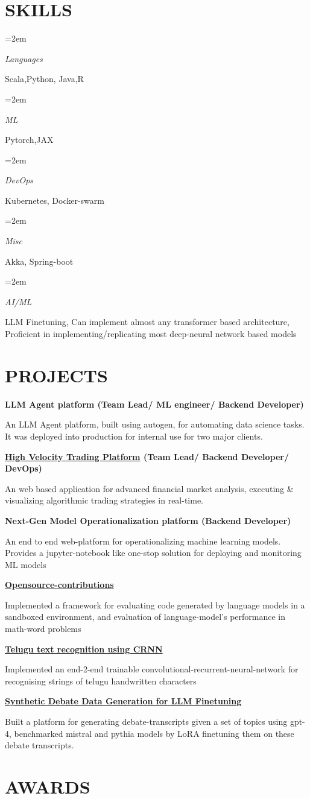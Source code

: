\documentclass[fontsize=11pt]{article}
\newlength{\spacebox}
\newcommand{\sepspace}{\vspace*{1em}}   %
\newcommand{\NewPart}[1]{\section*{\uppercase{#1}}}
\newcommand{\PersonalEntry}[2]{
    \noindent\hangindent=2em\hangafter=0 %
    \parbox{\spacebox}{                  %
    \textit{#1}}                      %
    \hspace{1.5em} #2 \par}              %
\newcommand{\SkillsEntry}[2]{                %
    \noindent\hangindent=2em\hangafter=0 %
    \parbox{\spacebox}{                  %
    \textit{#1}}                    %
    \hspace{1.5em} #2 \par}              %
\newcommand{\EducationEntry}[4]{
    \noindent \textbf{#1} \hfill      %
    \colorbox{Black}{
      \parbox{8.5em}{
      \hfill\color{White}#2}} \par  %
    \noindent \textit{#3} \par        %
    \noindent\hangindent=2em\hangafter=0 \small #4 %
    \normalsize \par}
\newcommand{\ProjectEntry}[4]{         %
    \noindent \textbf{#1} \noindent \textit{#3} \hfill {#2} \par
    \noindent \small #4 %
    \normalsize \par}
\begin{document}
\NewPart{Skills}{}
\SkillsEntry{Languages}{Scala,Python, Java,R}
\SkillsEntry{ML}{Pytorch,JAX}
\SkillsEntry{DevOps}{Kubernetes, Docker-swarm}
\SkillsEntry{Misc}{Akka, Spring-boot}
\SkillsEntry{AI/ML}{LLM Finetuning, Can implement almost any transformer based architecture, Proficient in implementing/replicating most deep-neural network based models}

\NewPart{Projects}{}

\ProjectEntry{LLM Agent platform (Team Lead/ ML engineer/ Backend Developer)}{}
{}
{An LLM Agent platform, built using autogen, for automating data science tasks. It was deployed into production for internal use for two major clients.}
\sepspace
\ProjectEntry{\href{Tplusone.Org}{High Velocity Trading Platform} (Team Lead/ Backend Developer/ DevOps)}{}
{}
{An web based application for advanced financial market analysis, executing \& visualizing algorithmic trading strategies in real-time.}
\sepspace
\pagebreak
\ProjectEntry{Next-Gen Model Operationalization platform (Backend Developer)}{}
{}
{An end to end web-platform for operationalizing machine learning models. Provides a jupyter-notebook like one-stop solution for deploying and monitoring ML models}
\sepspace
\ProjectEntry{\href{https://github.com/rokosbasilisk/code-eval-harness}{Opensource-contributions}}{}
{}
{Implemented a framework for evaluating code generated by language models in a sandboxed environment, and evaluation of language-model's performance in math-word problems}
\sepspace
\ProjectEntry{\href{https://www.ijeat.org/wp-content/uploads/papers/v8i5/E7422068519.pdf}{Telugu text recognition using CRNN}}{}
{}
{Implemented an end-2-end trainable convolutional-recurrent-neural-network for recognising strings of telugu handwritten characters}
\sepspace
\ProjectEntry{\href{https://github.com/rokosbasilisk/synthetic_debates/}{Synthetic Debate Data Generation for LLM Finetuning}}{}
{}
{Built a platform for generating debate-transcripts given a set of topics using gpt-4, benchmarked mistral and pythia models by LoRA finetuning them on these debate transcripts.}

\NewPart{Awards}{}
\end{document}
